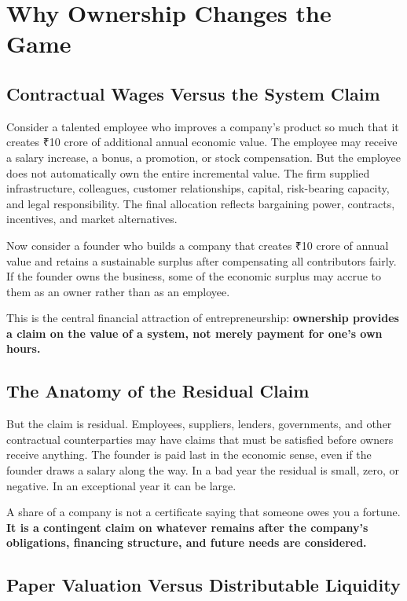 \section{Why Ownership Changes the Game}

\subsection{Contractual Wages Versus the System Claim}

Consider a talented employee who improves a company's product so much that it creates ₹10 crore of additional annual economic value. The employee may receive a salary increase, a bonus, a promotion, or stock compensation. But the employee does not automatically own the entire incremental value. The firm supplied infrastructure, colleagues, customer relationships, capital, risk-bearing capacity, and legal responsibility. The final allocation reflects bargaining power, contracts, incentives, and market alternatives.

 Now consider a founder who builds a company that creates ₹10 crore of annual value and retains a sustainable surplus after compensating all contributors fairly. If the founder owns the business, some of the economic surplus may accrue to them as an owner rather than as an employee.

This is the central financial attraction of entrepreneurship: \textbf{ownership provides a claim on the value of a system, not merely payment for one's own hours.}

\subsection{The Anatomy of the Residual Claim}

 But the claim is residual. Employees, suppliers, lenders, governments, and other contractual counterparties may have claims that must be satisfied before owners receive anything. The founder is paid last in the economic sense, even if the founder draws a salary along the way. In a bad year the residual is small, zero, or negative. In an exceptional year it can be large.

A share of a company is not a certificate saying that someone owes you a fortune. \textbf{It is a contingent claim on whatever remains after the company's obligations, financing structure, and future needs are considered.}

\subsection{Paper Valuation Versus Distributable Liquidity}

